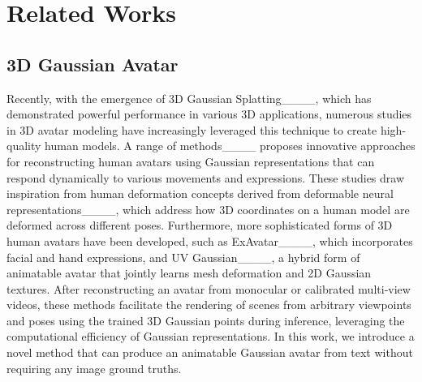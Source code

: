 \section{Related Works}
\subsection{3D Gaussian Avatar}

Recently, with the emergence of 3D Gaussian Splatting____, which has demonstrated powerful performance in various 3D applications, numerous studies in 3D avatar modeling have increasingly leveraged this technique to create high-quality human models. A range of methods____ proposes innovative approaches for reconstructing human avatars using Gaussian representations that can respond dynamically to various movements and expressions. 
These studies draw inspiration from human deformation concepts derived from deformable neural representations____, which address how 3D coordinates on a human model are deformed across different poses.
Furthermore, more sophisticated forms of 3D human avatars have been developed, such as ExAvatar____, which incorporates facial and hand expressions, and UV Gaussian____, a hybrid form of animatable avatar that jointly learns mesh deformation and 2D Gaussian textures.
After reconstructing an avatar from monocular or calibrated multi-view videos, these methods facilitate the rendering of scenes from arbitrary viewpoints and poses using the trained 3D Gaussian points during inference, leveraging the computational efficiency of Gaussian representations. 
In this work, we introduce a novel method that can produce an animatable Gaussian avatar from text without requiring any image ground truths.



